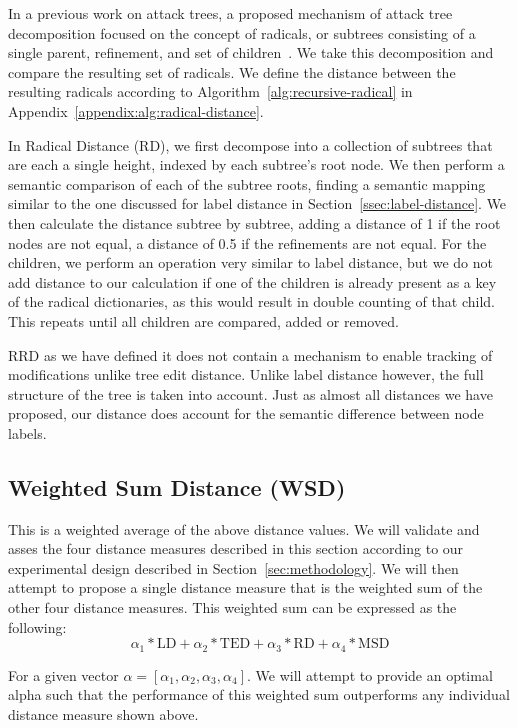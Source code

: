 In a previous work on attack trees, a proposed mechanism of attack tree decomposition focused on the concept of radicals, or subtrees consisting of a single parent, refinement, and set of children~\cite{schiele2021novel}. We take this decomposition and compare the resulting set of radicals. We define the distance between the resulting radicals according to Algorithm~\ref{alg:recursive-radical} in Appendix~\ref{appendix:alg:radical-distance}.

In Radical Distance (RD), we first decompose into a collection of subtrees that are each a single height, indexed by each subtree's root node. We then perform a semantic comparison of each of the subtree roots, finding a semantic mapping similar to the one discussed for label distance in Section~\ref{ssec:label-distance}. We then calculate the distance subtree by subtree, adding a distance of 1 if the root nodes are not equal, a distance of 0.5 if the refinements are not equal. For the children, we perform an operation very similar to label distance, but we do not add distance to our calculation if one of the children is already present as a key of the radical dictionaries, as this would result in double counting of that child. This repeats until all children are compared, added or removed.

RRD as we have defined it does not contain a mechanism to enable tracking of modifications unlike tree edit distance. Unlike label distance however, the full structure of the tree is taken into account. Just as almost all distances we have proposed, our distance does account for the semantic difference between node labels.




\subsection{Weighted Sum Distance (WSD)}

This is a weighted average of the above distance values. We will validate and asses the four distance measures described in this section according to our experimental design described in Section~\ref{sec:methodology}. We will then attempt to propose a single distance measure that is the weighted sum of the other four distance measures. This weighted sum can be expressed as the following:
\[
    \alpha_1*\text{LD}+ \alpha_2*\text{TED} + \alpha_3*\text{RD} + \alpha_4*\text{MSD}
\]

For a given vector $\alpha = [\alpha_1, \alpha_2, \alpha_3, \alpha_4]$. We will attempt to provide an optimal alpha such that the performance of this weighted sum outperforms any individual distance measure shown above.






